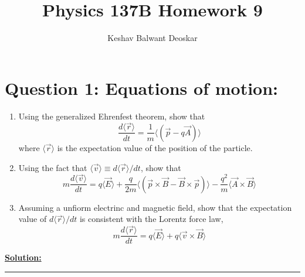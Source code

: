 \documentclass{article}
\title{Physics 137B Homework 9}
\author{Keshav Balwant Deoskar}
\newcommand{\mean}[1]{\langle #1 \rangle}
\begin{document}
\maketitle



\section*{Question 1: Equations of motion:} 
\begin{enumerate}[label=(\alph*)]
  \item Using the generalized Ehrenfest theorem, show that 
  \[  \frac{d\mean{\vec{r}}}{dt} = \frac{1}{m} \mean{\left(\vec{p} - q\vec{A}\right)}  \] where $\mean{\vec{r}}$ is the expectation value of the position of the particle.

  \item Using the fact that $\mean{\vec{v}} \equiv d\mean{\vec{r}}/dt$, show that 
  \[ m\frac{d\mean{\vec{v}}}{dt} = q \mean{\vec{E}} + \frac{q}{2m} \mean{\left(\vec{p} \times \vec{B} - \vec{B} \times \vec{p}\right)} - \frac{q^2}{m} \mean{\vec{A} \times \vec{B}} \]

  \item Assuming a unfiorm electrinc and magnetic field, show that the expectation value of $d\mean{\vec{r}}/dt$ is consistent with the Lorentz force law,
  \[ m\frac{d\mean{\vec{r}}}{dt} = q \mean{\vec{E}} + q\mean{\vec{v} \times \vec{B}}  \]
\end{enumerate}

\vskip 0.5cm
\underline{\textbf{Solution:}} 


\vskip 0.5cm 
\hrule 
\vskip 0.5cm



\end{document}
